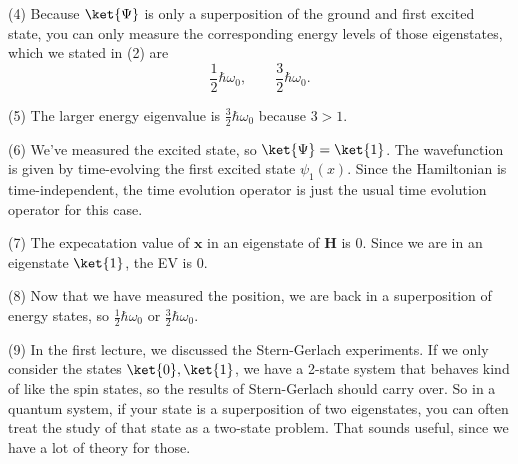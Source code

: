 \documentclass[11pt, letterpaper]{article}
\begin{document}
(4) Because $\ket{\Psi }$ is only a superposition of the ground and first excited state, you can only measure the corresponding energy levels of those eigenstates, which we stated in (2) are
\[
	\frac{1}{2} \hbar\omega _0,\qquad \frac{3}{2} \hbar\omega _0
.\]

(5) The larger energy eigenvalue is $\frac{3}{2} \hbar\omega _0$ because $3>1$.

(6) We've measured the excited state, so $\ket{\Psi }=\ket{1}$. The wavefunction is given by time-evolving the first excited state $\psi _1(x)$. Since the Hamiltonian is time-independent, the time evolution operator is just the usual time evolution operator for this case.

(7) The expecatation value of $\mathbf{x} $ in an eigenstate of $\mathbf{H} $ is 0. Since we are in an eigenstate $\ket{1}$, the EV is 0.


(8) Now that we have measured the position, we are back in a superposition of energy states, so $\frac{1}{2} \hbar\omega _0 $ or $\frac{3}{2} \hbar\omega _0$.

(9) In the first lecture, we discussed the Stern-Gerlach experiments. If we only consider the states $\ket{0},\ket{1}$, we have a 2-state system that behaves kind of like the spin states, so the results of Stern-Gerlach should carry over. So in a quantum system, if your state is a superposition of two eigenstates, you can often treat the study of that state as a two-state problem. That sounds useful, since we have a lot of theory for those.
\end{document}
